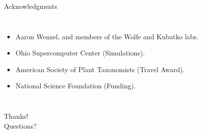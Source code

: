 \documentclass[presentation,sansserif]{beamer}
\begin{document}
\begin{frame}[t,plain]{Acknowledgments}
	\begin{columns}[onlytextwidth]
	\begin{itemize}
		\item Aaron Wenzel, and members of the Wolfe and Kubatko labs.
		\item Ohio Supercomputer Center (Simulations).
		\item American Society of Plant Taxonomists (Travel Award).
		\item National Science Foundation (Funding).
	\end{itemize}

	\begin{center}
	\end{center}
	\end{columns}
\end{frame}

\begin{frame}[c,plain]{}
	\begin{center}
		{\Huge Thanks!}\\
		\vspace{0.5in}
		{\LARGE Questions?}
	\end{center}
\end{frame}
\end{document}
